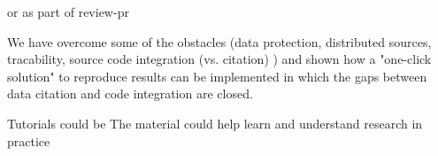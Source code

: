 \documentclass{acm_proc_article-sp}
\begin{document}
or as part of review-pr



We have overcome some of the obstacles (data protection, distributed sources, tracability, source code integration (vs. citation) ) and shown how a "one-click solution" to reproduce results can be implemented in which the gaps between data citation and code integration are closed.

Tutorials could be 
The material could help learn and understand research in practice













%
%

%
%


%
%



\end{document}
